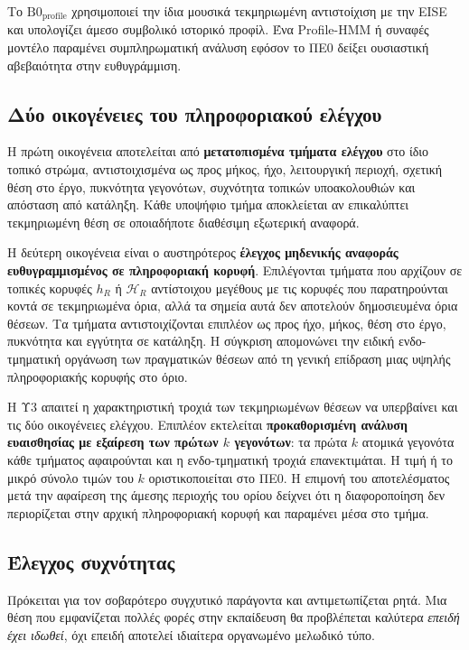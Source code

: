 \documentclass[11pt,a4paper]{article}
\begin{document}
Το $\mathrm{B0}_{\mathrm{profile}}$ χρησιμοποιεί την ίδια μουσικά τεκμηριωμένη αντιστοίχιση με την EISE και υπολογίζει άμεσο συμβολικό ιστορικό προφίλ. Ένα Profile-HMM ή συναφές μοντέλο παραμένει συμπληρωματική ανάλυση εφόσον το ΠΕ0 δείξει ουσιαστική αβεβαιότητα στην ευθυγράμμιση.

\subsection{Δύο οικογένειες του πληροφοριακού ελέγχου}\label{app:match-info-controls}

Η πρώτη οικογένεια αποτελείται από \textbf{μετατοπισμένα τμήματα ελέγχου} στο ίδιο τοπικό στρώμα, αντιστοιχισμένα ως προς μήκος, ήχο, λειτουργική περιοχή, σχετική θέση στο έργο, πυκνότητα γεγονότων, συχνότητα τοπικών υποακολουθιών και απόσταση από κατάληξη. Κάθε υποψήφιο τμήμα αποκλείεται αν επικαλύπτει τεκμηριωμένη θέση σε οποιαδήποτε διαθέσιμη εξωτερική αναφορά.

Η δεύτερη οικογένεια είναι ο αυστηρότερος \textbf{έλεγχος μηδενικής αναφοράς ευθυγραμμισμένος σε πληροφοριακή κορυφή}. Επιλέγονται τμήματα που αρχίζουν σε τοπικές κορυφές \(h_R\) ή \(\mathcal H_R\) αντίστοιχου μεγέθους με τις κορυφές που παρατηρούνται κοντά σε τεκμηριωμένα όρια, αλλά τα σημεία αυτά δεν αποτελούν δημοσιευμένα όρια θέσεων. Τα τμήματα αντιστοιχίζονται επιπλέον ως προς ήχο, μήκος, θέση στο έργο, πυκνότητα και εγγύτητα σε κατάληξη. Η σύγκριση απομονώνει την ειδική ενδο-τμηματική οργάνωση των πραγματικών θέσεων από τη γενική επίδραση μιας υψηλής πληροφοριακής κορυφής στο όριο.

Η Υ3 απαιτεί η χαρακτηριστική τροχιά των τεκμηριωμένων θέσεων να υπερβαίνει και τις δύο οικογένειες ελέγχου. Επιπλέον εκτελείται \textbf{προκαθορισμένη ανάλυση ευαισθησίας με εξαίρεση των πρώτων \(k\) γεγονότων}: τα πρώτα \(k\) ατομικά γεγονότα κάθε τμήματος αφαιρούνται και η ενδο-τμηματική τροχιά επανεκτιμάται. Η τιμή ή το μικρό σύνολο τιμών του \(k\) οριστικοποιείται στο ΠΕ0. Η επιμονή του αποτελέσματος μετά την αφαίρεση της άμεσης περιοχής του ορίου δείχνει ότι η διαφοροποίηση δεν περιορίζεται στην αρχική πληροφοριακή κορυφή και παραμένει μέσα στο τμήμα.

\subsection{Έλεγχος συχνότητας}\label{app:match-frequency}

Πρόκειται για τον σοβαρότερο συγχυτικό παράγοντα και αντιμετωπίζεται ρητά. Μια θέση που εμφανίζεται πολλές φορές στην εκπαίδευση θα προβλέπεται καλύτερα \emph{επειδή έχει ιδωθεί}, όχι επειδή αποτελεί ιδιαίτερα οργανωμένο μελωδικό τύπο.
\end{document}
